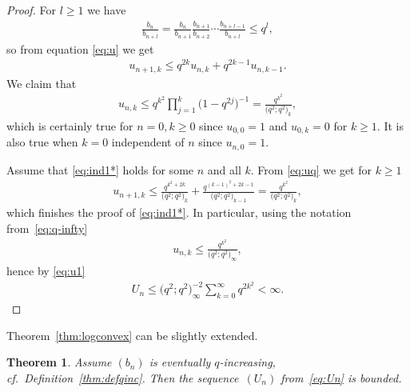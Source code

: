 \documentclass[11pt]{article}
\numberwithin{equation}{section}
\newtheorem{thm}{Theorem}[section]
\begin{document}
\begin{proof}For $l\ge 1$ we have
\begin{gather}\label{eq:logcv-q}
\frac{b_n}{b_{n+l}}=\frac{b_n}{b_{n+1}}\frac{b_{n+1}}{b_{n+2}}\cdots\frac{b_{n+l-1}}{b_{n+l}}\le q^l,
\end{gather}
 so from equation \eqref{eq:u} we get
\begin{gather}\label{eq:uq}
u_{n+1,k}\le q^{2k} u_{n,k}+q^{2k-1}u_{n,k-1}.
\end{gather}
We claim that
\begin{gather}\label{eq:ind1*}
u_{n,k}\le q^{k^2}\prod_{j=1}^k\big(1-q^{2j}\big)^{-1}=\frac{q^{k^2}}{\big(q^2;q^2\big)_k},
\end{gather}
which is certainly true for $n=0,k\ge 0$ since $u_{0,0}=1$ and $u_{0,k}=0$ for $k\ge 1$. It is also true when $k=0$ independent of $n$ since $u_{n,0}=1$.

Assume that \eqref{eq:ind1*} holds for some $n$ and all $k$. From \eqref{eq:uq} we get for $k\ge 1$
\begin{gather*}
u_{n+1,k}\le \frac{q^{k^2+2k}}{\big(q^2;q^2\big)_k}+\frac{q^{(k-1)^2+2k-1}}{\big(q^2;q^2\big)_{k-1}}=\frac{q^{k^2}}{\big(q^2;q^2\big)_k},
\end{gather*}
which finishes the proof of \eqref{eq:ind1*}. In particular, using the notation from~\eqref{eq:q-infty}
\begin{gather*}
u_{n,k}\le \frac{q^{k^2}}{\big(q^2;q^2\big)_\infty},
\end{gather*}
hence by \eqref{eq:u1}
\begin{gather*}
U_n\le \big(q^2;q^2\big)_\infty^{-2} \sum_{k=0}^{\infty}q^{2k^2}<\infty.\tag*{\qed}
\end{gather*}\renewcommand{\qed}{}
\end{proof}

Theorem~\ref{thm:logconvex} can be slightly extended.

\begin{thm}\label{thm:evtlogconvex} Assume $(b_n)$ is eventually $q$-increasing, cf.\ Definition~{\rm \ref{thm:defqinc}}. Then the sequen\-ce~$(U_n)$ from~\eqref{eq:Un} is bounded.
\end{thm}
\end{document}
